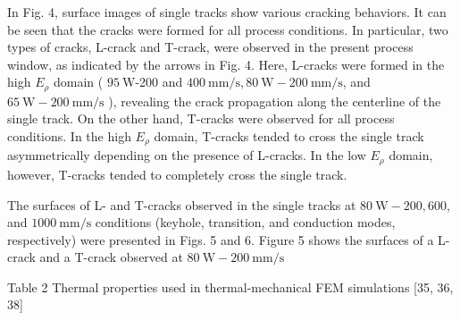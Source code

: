 \documentclass[10pt]{article}
\begin{document}
In Fig. 4, surface images of single tracks show various cracking behaviors. It can be seen that the cracks were formed for all process conditions. In particular, two types of cracks, L-crack and T-crack, were observed in the present process window, as indicated by the arrows in Fig. 4. Here, L-cracks were formed in the high $E_{\rho}$ domain ( $95 \mathrm{~W}$-200 and $400 \mathrm{~mm} / \mathrm{s}, 80 \mathrm{~W}-200 \mathrm{~mm} / \mathrm{s}$, and $65 \mathrm{~W}-200 \mathrm{~mm} / \mathrm{s}$ ), revealing the crack propagation along the centerline of the single track. On the other hand, T-cracks were observed for all process conditions. In the high $E_{\rho}$ domain, T-cracks tended to cross the single track asymmetrically depending on the presence of L-cracks. In the low $E_{\rho}$ domain, however, T-cracks tended to completely cross the single track.

The surfaces of L- and T-cracks observed in the single tracks at $80 \mathrm{~W}-200,600$, and $1000 \mathrm{~mm} / \mathrm{s}$ conditions (keyhole, transition, and conduction modes, respectively) were presented in Figs. 5 and 6. Figure 5 shows the surfaces of a L-crack and a T-crack observed at $80 \mathrm{~W}-200 \mathrm{~mm} / \mathrm{s}$

Table 2 Thermal properties used in thermal-mechanical FEM simulations [35, 36, 38]
\end{document}
